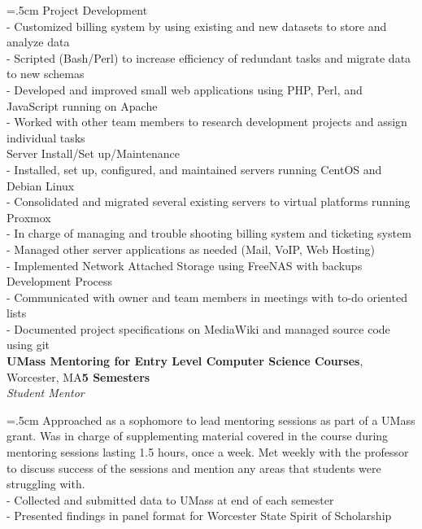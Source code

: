 \documentclass[10pt,notitlepage]{article}
\newcommand{\B}[1]{\textbf{#1}}
\newcommand{\I}[1]{\textit{#1}}
\begin{document}
\hangindent=.5cm Project Development\\
	\indent - Customized billing system by using existing and new datasets to store and analyze data \\
	\indent - Scripted (Bash/Perl) to increase efficiency of redundant tasks and migrate data to new schemas \\
	\indent - Developed and improved small web applications using PHP, Perl, and JavaScript running on Apache \\
	\indent - Worked with other team members to research development projects and assign individual tasks \\
Server Install/Set up/Maintenance\\
	\indent - Installed, set up, configured, and maintained servers running CentOS and Debian Linux\\
	\indent - Consolidated and migrated several existing servers to virtual platforms running Proxmox \\
	\indent - In charge of managing and trouble shooting billing system and ticketing system \\
	\indent - Managed other server applications as needed (Mail, VoIP, Web Hosting) \\
	\indent - Implemented Network Attached Storage using FreeNAS with backups \\
Development Process\\
	\indent - Communicated with owner and team members in meetings with to-do oriented lists \\
	\indent - Documented project specifications on MediaWiki and managed source code using git \\

\noindent \B{UMass Mentoring for Entry Level Computer Science Courses}, Worcester,
MA\hfill\B{5 Semesters}\\
\I{Student Mentor}

\hangindent=.5cm Approached as a sophomore to lead mentoring
sessions as part of a UMass grant. Was in charge of supplementing material covered in the course
during mentoring sessions lasting 1.5 hours, once a week. Met weekly with the professor to 
discuss success of the sessions and mention any areas that students were struggling with.
\\
\indent - Collected and submitted data to UMass at end of each semester\\
\indent - Presented findings in panel format for Worcester State Spirit of Scholarship
\end{document}

